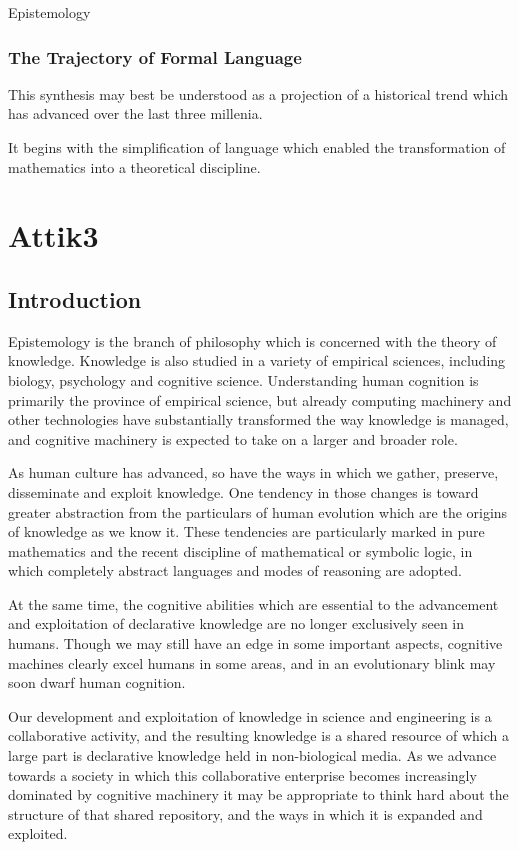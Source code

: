 \documentclass[10pt,titlepage]{book}
\begin{document}
Epistemology 
 

 \subsection{The Trajectory of Formal Language}

 This synthesis may best be understood as a projection of a historical trend which has advanced over the last three millenia.

 It begins with the simplification of language which enabled the transformation of mathematics into a theoretical discipline.


\chapter{Attik3}

\section{Introduction}
Epistemology is the branch of philosophy which is concerned with the theory of knowledge.
Knowledge is also studied in a variety of empirical sciences, including biology, psychology and cognitive science.
Understanding human cognition is primarily the province of empirical science, but already computing machinery and other technologies have substantially transformed the way knowledge is managed, and cognitive machinery is expected to take on a larger and broader role.

As human culture has advanced, so have the ways in which we gather, preserve, disseminate and exploit knowledge.
One tendency in those changes is toward greater abstraction from the particulars of human evolution which are the origins of knowledge as we know it.
These tendencies are particularly marked in pure mathematics and the recent discipline of mathematical or symbolic logic, in which completely abstract languages and modes of reasoning are adopted.

At the same time, the cognitive abilities which are essential to the advancement and exploitation of declarative knowledge are no longer exclusively seen in humans.
Though we may still have an edge in some important aspects, cognitive machines clearly excel humans in some areas, and in an evolutionary blink may soon dwarf human cognition.

Our development and exploitation of knowledge in science and engineering is a collaborative activity, and the resulting knowledge is a shared resource of which a large part is declarative knowledge held in non-biological media.
As we advance towards a society in which this collaborative enterprise becomes increasingly dominated by cognitive machinery it may be appropriate to think hard about the structure of that shared repository, and the ways in which it is expanded and exploited.
\end{document}
